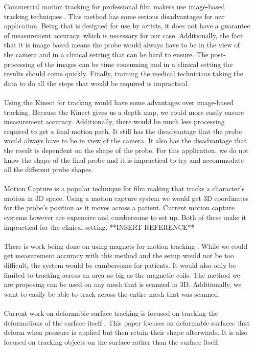 \documentclass[conference]{acmsiggraph}
\begin{document}
Commercial motion tracking for professional film makers use image-based tracking techniques \cite{trackingwebsite}. This method has some serious disadvantages for our application. Being that is designed for use by artists, it does not have a guarantee of measurement accuracy, which is necessary for our case. Additionally, the fact that it is image based means the probe would always have to be in the view of the camera and in a clinical setting that can be hard to ensure. The post-processing of the images can be time consuming and in a clinical setting the results should come quickly. Finally, training the medical technicians taking the data to do all the steps that would be required is impractical. \\
\\
Using the Kinect for tracking would have some advantages over image-based tracking. Because the Kinect gives us a depth map, we could more easily ensure measurement accuracy. Additionally, there would be much less processing required to get a final motion path. It still has the disadvantage that the probe would always have to be in view of the camera. It also has the disadvantage that the result is dependent on the shape of the probe. For this application, we do not know the shape of the final probe and it is impractical to try and accommodate all the different probe shapes.\\
\\
Motion Capture is a popular technique for film making that tracks a character's motion in 3D space. Using a motion capture system we would get 3D coordinates for the probe's position as it moves across a patient. Current motion capture systems however are expensive and cumbersome to set up. Both of these make it impractical for the clinical setting. **INSERT REFERENCE**\\
\\
There is work being done on using magnets for motion tracking \cite{magnetictracking}. While we could get measurement accuracy with this method and the setup would not be too difficult, the system would be cumbersome for patients. It would also only be limited to tracking across an area as big as the magnetic coils. The method we are proposing can be used on any mesh that is scanned in 3D. Additionally, we want to easily be able to track across the entire mesh that was scanned.\\
\\
Current work on deformable surface tracking is focused on tracking the deformations of the surface itself \cite{deformableobjecttracking,convexopt}. This paper focuses on deformable surfaces that deform when pressure is applied but then retain their shape afterwards. It is also focused on tracking objects on the surface rather than the surface itself.\\
\end{document}
